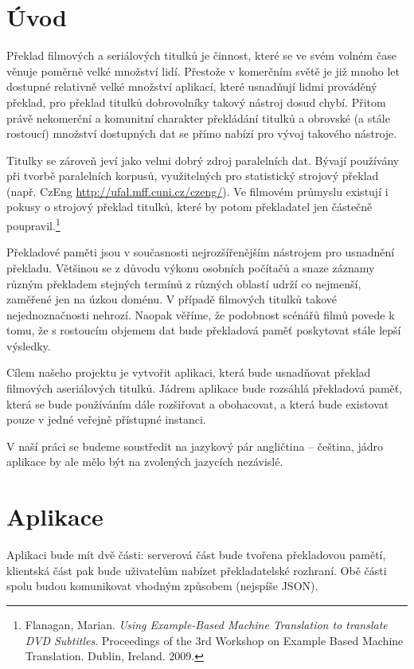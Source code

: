 \section{Úvod}

Překlad filmových a seriálových titulků je činnost, které se ve svém volném čase věnuje poměrně velké množství lidí. Přestože v komerčním světě je již mnoho let dostupné relativně velké množství aplikací, které usnadňují lidmi prováděný překlad, pro překlad titulků dobrovolníky takový nástroj dosud chybí. Přitom právě nekomerční a komunitní charakter překládání titulků a obrovské (a stále rostoucí) množství dostupných dat se přímo nabízí pro vývoj takového nástroje.

Titulky se zároveň jeví jako velmi dobrý zdroj paralelních dat. Bývají používány při tvorbě paralelních korpusů, využitelných pro statistický strojový překlad (např. CzEng \url{http://ufal.mff.cuni.cz/czeng/}). Ve filmovém průmyslu existují i pokusy o strojový překlad titulků, které by potom překladatel jen částečně poupravil.\footnote{Flanagan, Marian. \emph{Using Example-Based Machine Translation to translate DVD Subtitles}. Proceedings of the 3rd Workshop on Example Based Machine Translation. Dublin, Ireland. 2009.}

Překladové paměti jsou v současnosti nejrozšířenějším nástrojem pro usnadnění překladu. Většinou se z důvodu výkonu osobních počítačů a snaze  záznamy různým překladem stejných termínů z různých oblastí udrží co nejmenší, zaměřené jen na úzkou doménu. V případě filmových titulků takové nejednoznačnosti nehrozí. Naopak věříme, že podobnost scénářů filmů povede k tomu, že s rostoucím objemem dat bude překladová paměť poskytovat stále lepší výsledky.

Cílem našeho projektu je vytvořit aplikaci, která bude usnadňovat překlad filmových aseriálových titulků. Jádrem aplikace bude rozsáhlá překladová paměť, která se bude používáním dále rozšiřovat a obohacovat, a která bude existovat pouze v jedné veřejně přístupné instanci.

V naší práci se budeme soustředit na jazykový pár angličtina – čeština, jádro aplikace by ale mělo být na zvolených jazycích nezávislé.

\section{Aplikace}
Aplikaci bude mít dvě části: serverová část bude tvořena překladovou pamětí, klientská část pak bude uživatelům nabízet překladatelské rozhraní. Obě části spolu budou komunikovat vhodným způsobem (nejspíše JSON).

